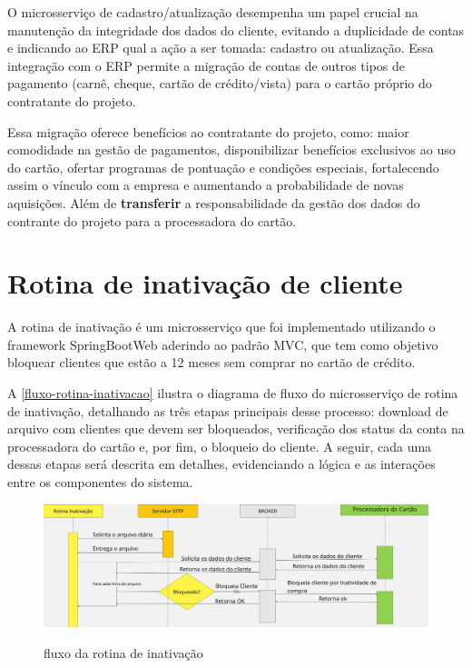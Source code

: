 O microsserviço de cadastro/atualização desempenha um papel crucial na manutenção 
da integridade dos dados do cliente, evitando a duplicidade de contas e indicando 
ao ERP qual a ação a ser tomada: cadastro ou atualização. Essa integração com o ERP permite a migração  de contas de outros tipos de 
pagamento (carnê, cheque, cartão de crédito/vista) para o cartão próprio do 
contratante do projeto. 

Essa migração oferece benefícios ao contratante 
do projeto, como: maior comodidade na gestão de pagamentos, disponibilizar 
benefícios exclusivos ao uso do cartão, ofertar programas de pontuação e 
condições especiais, fortalecendo assim o vínculo com a empresa e aumentando a 
probabilidade de novas aquisições. Além de \textbf{transferir} a responsabilidade da gestão 
dos dados do contrante do projeto para a processadora do cartão.

\section{Rotina de inativação de cliente}

A rotina de inativação é um microsserviço que foi implementado utilizando o 
framework SpringBootWeb aderindo ao padrão MVC, que tem como objetivo bloquear 
clientes que estão a 12 meses sem comprar no cartão de crédito.

A \autoref{fluxo-rotina-inativacao} ilustra o diagrama de fluxo do microsserviço 
de rotina de inativação, detalhando as três etapas principais desse processo: 
download de arquivo com clientes que devem ser bloqueados, verificação dos status 
da conta na processadora do cartão e, por fim, o bloqueio do cliente. A seguir, 
cada uma dessas etapas será descrita em detalhes, evidenciando a lógica e as 
interações entre os componentes do sistema. 

\begin{figure} [!h]
    \centering
    \caption{fluxo da rotina de inativação}
    \includegraphics[width=1\textwidth]{arquivos/imagens/fluxo-rotina-inativacao.jpg}
    \label{fluxo-rotina-inativacao}
\end{figure}

